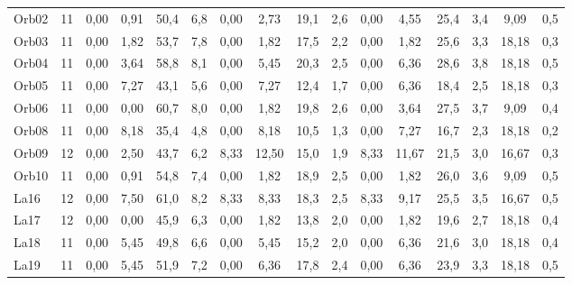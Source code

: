 \begin{landscape}
\begin{table}[H]
\begin{tabular}{ll|cccc|cccc|cccc|cc}
Orb02                      & 11                     & 0,00    & 0,91    & 50,4   & 6,8    & 0,00    & 2,73   & 19,1  & 2,6   & 0,00    & 4,55   & 25,4  & 3,4   & 9,09        & 0,5       \\
Orb03                      & 11                     & 0,00    & 1,82    & 53,7   & 7,8    & 0,00    & 1,82   & 17,5  & 2,2   & 0,00    & 1,82   & 25,6  & 3,3   & 18,18       & 0,3       \\
Orb04                      & 11                     & 0,00    & 3,64    & 58,8   & 8,1    & 0,00    & 5,45   & 20,3  & 2,5   & 0,00    & 6,36   & 28,6  & 3,8   & 18,18       & 0,5       \\
Orb05                      & 11                     & 0,00    & 7,27    & 43,1   & 5,6    & 0,00    & 7,27   & 12,4  & 1,7   & 0,00    & 6,36   & 18,4  & 2,5   & 18,18       & 0,3       \\
Orb06                      & 11                     & 0,00    & 0,00    & 60,7   & 8,0    & 0,00    & 1,82   & 19,8  & 2,6   & 0,00    & 3,64   & 27,5  & 3,7   & 9,09        & 0,4       \\
Orb08                      & 11                     & 0,00    & 8,18    & 35,4   & 4,8    & 0,00    & 8,18   & 10,5  & 1,3   & 0,00    & 7,27   & 16,7  & 2,3   & 18,18       & 0,2       \\
Orb09                      & 12                     & 0,00    & 2,50    & 43,7   & 6,2    & 8,33    & 12,50  & 15,0  & 1,9   & 8,33    & 11,67  & 21,5  & 3,0   & 16,67       & 0,3       \\
Orb10                      & 11                     & 0,00    & 0,91    & 54,8   & 7,4    & 0,00    & 1,82   & 18,9  & 2,5   & 0,00    & 1,82   & 26,0  & 3,6   & 9,09        & 0,5       \\
La16                       & 12                     & 0,00    & 7,50    & 61,0   & 8,2    & 8,33    & 8,33   & 18,3  & 2,5   & 8,33    & 9,17   & 25,5  & 3,5   & 16,67       & 0,5       \\
La17                       & 12                     & 0,00    & 0,00    & 45,9   & 6,3    & 0,00    & 1,82   & 13,8  & 2,0   & 0,00    & 1,82   & 19,6  & 2,7   & 18,18       & 0,4       \\
La18                       & 11                     & 0,00    & 5,45    & 49,8   & 6,6    & 0,00    & 5,45   & 15,2  & 2,0   & 0,00    & 6,36   & 21,6  & 3,0   & 18,18       & 0,4       \\
La19                       & 11                     & 0,00    & 5,45    & 51,9   & 7,2    & 0,00    & 6,36   & 17,8  & 2,4   & 0,00    & 6,36   & 23,9  & 3,3   & 18,18       & 0,5       \\

\end{tabular}
\end{table}
\end{landscape}
